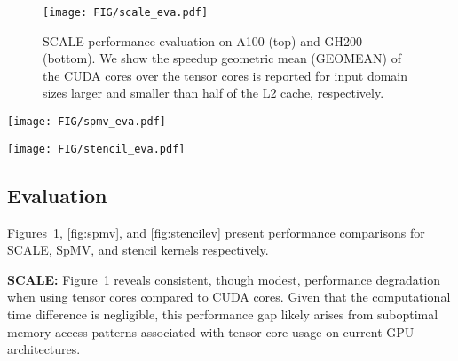 \begin{figure}[t!]
\vspace{-8pt}
    \centering
    \texttt{[image: FIG/scale\_eva.pdf]}
    \vspace{-25pt}
    \caption{SCALE performance evaluation on A100 (top) and GH200 (bottom). We show the speedup geometric mean (GEOMEAN) of the CUDA cores over the tensor cores is reported for input domain sizes larger and smaller than half of the L2 cache, respectively.}
    \label{fig:scaleeval}
\end{figure}
\begin{figure*}[ht!]
\vspace{-15pt}
    \centering
    \texttt{[image: FIG/spmv\_eva.pdf]}
    \vspace{-30pt}
    \caption{Comparison of cuSPARSE (CUDA Core) and DASP (Tensor Core) in sparse matrix-vector multiplication on A100 (top) and GH200 (bottom). (a) \& (c) on the left report the performance in effective flops; (b) \& (d) on the right report the geometric mean speedup of cuSPARSE over DASP.}
    \label{fig:spmv}
\end{figure*}
\begin{figure*}[ht!]
\vspace{-12pt}
    \centering
    \texttt{[image: FIG/stencil\_eva.pdf]}
    \vspace{-30pt}
    \caption{Comparison of EBISU and Brick and ConvStencil and LoraStencil on A100 using a suite of stencil benchmarks. For LoRAStencil~\cite{lorastencil}, performance data and their assumed rank values from their artifact evaluation are included.}
    \label{fig:stencilev}
\end{figure*}

\subsection{Evaluation}


Figures~\ref{fig:scaleeval}, \ref{fig:spmv}, and \ref{fig:stencilev} present performance comparisons for SCALE, SpMV, and stencil kernels respectively. 

\noindent\textbf{SCALE:} Figure~\ref{fig:scaleeval} reveals consistent, though modest, performance degradation when using tensor cores compared to CUDA cores. Given that the computational time difference is negligible, this performance gap likely arises from suboptimal memory access patterns associated with tensor core usage on current GPU architectures.

